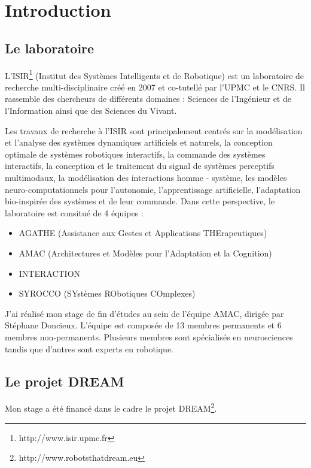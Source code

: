 \documentclass{llncs}
\begin{document}

\section{Introduction}


\subsection{Le laboratoire}

L'ISIR\footnote{http://www.isir.upmc.fr} (Institut des Systèmes Intelligents et de Robotique) est un laboratoire de recherche multi-disciplinaire créé en 2007 et co-tutellé par l'UPMC et le CNRS. Il rassemble des chercheurs de différents domaines : Sciences de l’Ingénieur et de l’Information ainsi que des Sciences du Vivant.

Les travaux de recherche à l'ISIR sont principalement centrés sur la modélisation et l'analyse des systèmes dynamiques artificiels et naturels, la conception optimale de systèmes robotiques interactifs, la commande des systèmes interactifs, la conception et le traitement du signal de systèmes perceptifs multimodaux, la modélisation des interactions homme - système, les modèles neuro-computationnels pour l’autonomie, l'apprentissage artificielle, l'adaptation bio-inspirée des systèmes et de leur commande. Dans cette perspective, le laboratoire est consitué de 4 équipes :
\begin{itemize}
\item AGATHE (Assistance aux Gestes et Applications THErapeutiques)
\item AMAC (Architectures et Modèles pour l'Adaptation et la Cognition)
\item INTERACTION
\item SYROCCO (SYstèmes RObotiques COmplexes)
\end{itemize}

J'ai réalisé mon stage de fin d'études au sein de l'équipe AMAC, dirigée par Stéphane Doncieux. L'équipe est composée de 13 membres permanents et 6 membres non-permanents. Plusieurs membres sont spécialisés en neurosciences tandis que d'autres sont experts en robotique.

\subsection{Le projet DREAM}
Mon stage a été financé dans le cadre le projet DREAM\footnote{http://www.robotsthatdream.eu}.
\end{document}
